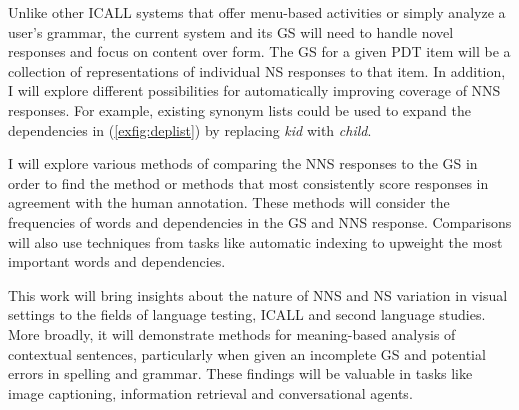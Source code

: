 \documentclass[11pt]{article}
\begin{document}

\noindent
Unlike other ICALL systems that offer menu-based activities or simply analyze a user's grammar, the current system and its GS will need to handle novel responses and focus on content over form. The GS for a given PDT item will be a collection of representations of individual NS responses to that item. In addition, I will explore different possibilities for automatically improving coverage of NNS responses. For example, existing synonym lists could be used to expand the dependencies in (\ref{exfig:deplist}) by replacing \textit{kid} with \textit{child}.

\noindent I will explore various methods of comparing the NNS responses to the GS in order to find the method or methods that most consistently score responses in agreement with the human annotation. These methods will consider the frequencies of words and dependencies in the GS and NNS response. Comparisons will also use techniques from tasks like automatic indexing to upweight the most important words and dependencies.

\noindent This work will bring insights about the nature of NNS and NS variation in visual settings to the fields of language testing, ICALL and second language studies. More broadly, it will demonstrate methods for meaning-based analysis of contextual sentences, particularly when given an incomplete GS and potential errors in spelling and grammar. These findings will be valuable in tasks like image captioning, information retrieval and conversational agents.



\end{document}
